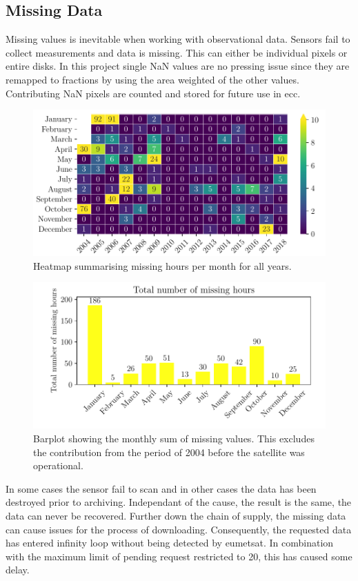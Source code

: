 \subsection{Missing Data} \label{sec:missing_values}
Missing values is inevitable when working with observational data. Sensors fail to collect measurements and data is missing. This can either be individual pixels or entire disks. In this project single NaN values are no pressing issue since they are remapped to fractions by using the area weighted of the other values. Contributing NaN pixels are counted and stored for future use in \acrshort{ecc}.
\begin{figure}
    \centering
    \includegraphics[scale = 1.0]{python_figs/heatmap_missing_values.pdf}
    \caption{Heatmap summarising missing hours per month for all years.}
    \label{fig:heatmap_missing_values}
\end{figure}
\begin{figure}
    \centering
    \includegraphics[scale = 1.0]{python_figs/heatmap_missing_values_monthly_sum.pdf}
    \caption{Barplot showing the monthly sum of missing values. This excludes the contribution from the period of 2004 before the satellite was operational.}
    \label{fig:barplot_missing_values}
\end{figure}
In some cases the sensor fail to scan and in other cases the data has been destroyed prior to archiving. Independant of the cause, the result is the same, the data can never be recovered. Further down the chain of supply, the missing data can cause issues for the process of downloading. Consequently, the requested data has entered infinity loop without being detected by \acrshort{eumetsat}. In combination with the maximum limit of pending request restricted to 20, this has caused some delay. 

